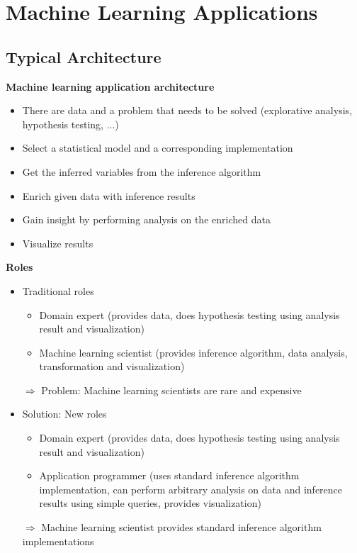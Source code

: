 \section{Machine Learning Applications}

\subsection{Typical Architecture}

\textbf{Machine learning application architecture}
\begin{itemize}
\item There are data and a problem that needs to be solved (explorative analysis, hypothesis testing, ...)
\item Select a statistical model and a corresponding implementation
\item Get the inferred variables from the inference algorithm
\item Enrich given data with inference results
\item Gain insight by performing analysis on the enriched data
\item Visualize results
\end{itemize}

\textbf{Roles}
\begin{itemize}
\item Traditional roles
	\begin{itemize}
	\item Domain expert (provides data, does hypothesis testing using analysis result and visualization)
	\item Machine learning scientist (provides inference algorithm, data analysis, transformation and visualization)
	\end{itemize}
	$\Rightarrow$ Problem: Machine learning scientists are rare and expensive
\item Solution: New roles
	\begin{itemize}
	\item Domain expert (provides data, does hypothesis testing using analysis result and visualization)
	\item Application programmer (uses standard inference algorithm implementation, can perform arbitrary analysis on data and inference results using simple queries, provides visualization)
	\end{itemize}
	$\Rightarrow$ Machine learning scientist provides standard inference algorithm implementations
\end{itemize}

